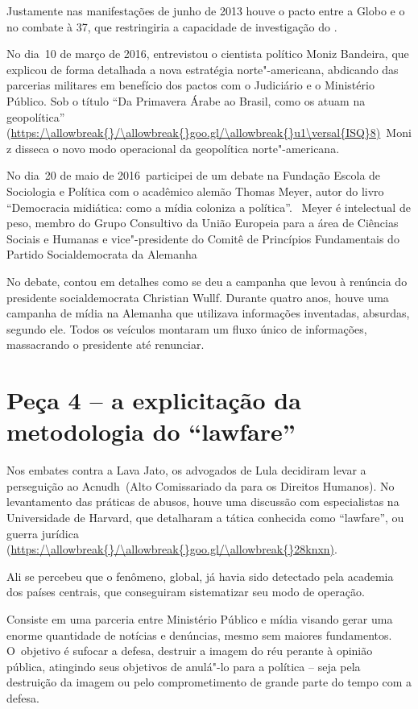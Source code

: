 Justamente nas manifestações de junho de 2013 houve o pacto entre a
Globo e o  no combate à  37, que restringiria a capacidade de
investigação do .

No dia~10 de março de 2016,  entrevistou o cientista político Moniz
Bandeira, que explicou de forma detalhada a nova estratégia
norte"-americana, abdicando das parcerias militares em benefício dos
pactos com o Judiciário e o Ministério Público. Sob o título ``Da
Primavera Árabe ao Brasil, como os  atuam na geopolítica''
(\url{https:/\allowbreak{}/\allowbreak{}goo.gl/\allowbreak{}u1\versal{ISQ}8)}~Moniz disseca o novo modo operacional da
geopolítica norte"-americana.

No dia~20 de maio de 2016~participei de um debate na Fundação Escola de
Sociologia e Política com o acadêmico alemão Thomas Meyer, autor do
livro ``Democracia midiática: como a mídia coloniza a política''. ~Meyer
é intelectual de peso, membro do Grupo Consultivo da União Europeia para
a área de Ciências Sociais e Humanas e vice"-presidente do Comitê de
Princípios Fundamentais do Partido Socialdemocrata da Alemanha

No debate, contou em detalhes como se deu a campanha que levou à
renúncia do presidente socialdemocrata Christian Wullf. Durante quatro
anos, houve uma campanha de mídia na Alemanha que utilizava informações
inventadas, absurdas, segundo ele. Todos os veículos montaram um fluxo
único de informações, massacrando o presidente até renunciar.

\section{Peça 4 -- a explicitação da metodologia do ``lawfare''}

Nos embates contra a Lava Jato, os advogados de Lula decidiram levar a
perseguição ao Acnudh~(Alto Comissariado da  para os Direitos
Humanos). No levantamento das práticas de abusos, houve uma discussão
com especialistas na Universidade de Harvard, que detalharam a tática
conhecida como ``lawfare'', ou guerra jurídica
(\url{https:/\allowbreak{}/\allowbreak{}goo.gl/\allowbreak{}28knxn)}.

Ali se percebeu que o fenômeno, global, já havia sido detectado pela
academia dos países centrais, que conseguiram sistematizar seu modo de
operação.

Consiste em uma parceria entre Ministério Público e mídia visando gerar
uma enorme quantidade de notícias e denúncias, mesmo sem maiores
fundamentos. O~objetivo é sufocar a defesa, destruir a imagem do réu
perante à opinião pública, atingindo seus objetivos de anulá"-lo para a
política -- seja pela destruição da imagem ou pelo comprometimento de
grande parte do tempo com a defesa.

